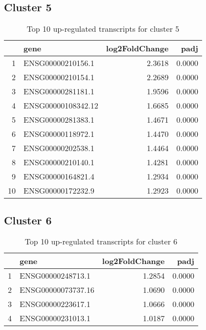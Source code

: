 \documentclass{article}
\begin{document}
\subsection{Cluster 5 }
\begin{table}[H]
\centering
\begin{tabular}{rlrr}
  \hline
 & gene & log2FoldChange & padj \\ 
  \hline
1 & ENSG00000210156.1 & 2.3618 & 0.0000 \\ 
  2 & ENSG00000210154.1 & 2.2689 & 0.0000 \\ 
  3 & ENSG00000281181.1 & 1.9596 & 0.0000 \\ 
  4 & ENSG00000108342.12 & 1.6685 & 0.0000 \\ 
  5 & ENSG00000281383.1 & 1.4671 & 0.0000 \\ 
  6 & ENSG00000118972.1 & 1.4470 & 0.0000 \\ 
  7 & ENSG00000202538.1 & 1.4464 & 0.0000 \\ 
  8 & ENSG00000210140.1 & 1.4281 & 0.0000 \\ 
  9 & ENSG00000164821.4 & 1.2934 & 0.0000 \\ 
  10 & ENSG00000172232.9 & 1.2923 & 0.0000 \\ 
   \hline
\end{tabular}
\caption{Top 10 up-regulated transcripts for cluster 5} 
\label{tab:q3_1_5}
\end{table}
\subsection{Cluster 6 }
\begin{table}[H]
\centering
\begin{tabular}{rlrr}
  \hline
 & gene & log2FoldChange & padj \\ 
  \hline
1 & ENSG00000248713.1 & 1.2854 & 0.0000 \\ 
  2 & ENSG00000073737.16 & 1.0690 & 0.0000 \\ 
  3 & ENSG00000223617.1 & 1.0666 & 0.0000 \\ 
  4 & ENSG00000231013.1 & 1.0187 & 0.0000 \\ 
   \hline
\end{tabular}
\caption{Top 10 up-regulated transcripts for cluster 6} 
\label{tab:q3_1_6}
\end{table}
\end{document}
